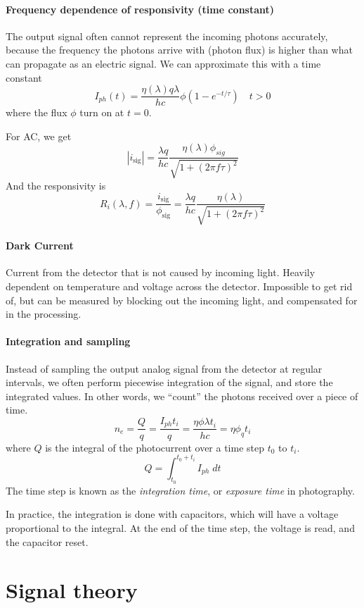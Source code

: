 \documentclass[article]{memoir}
\begin{document}
\paragraph{Frequency dependence of responsivity (time constant)}
The output signal often cannot represent the incoming photons accurately, because the frequency the photons arrive with (photon flux) is higher than what can propagate as an electric signal. We can approximate this with a time constant
\[
    I_{ph}(t) = \frac{\eta(\lambda)q\lambda}{hc}\phi\left(1 - e^{-t/\tau}\right) \quad t > 0
\]
where the flux \(\phi\) turn on at \(t=0\).

For AC, we get
\[
    |i_{\text{sig}}| = \frac{\lambda q}{h c} \frac{\eta(\lambda) \phi_{sig}}{\sqrt{1 + (2\pi f \tau)^2}}
\]
And the responsivity is
\[
    R_i(\lambda, f) = \frac{i_{\text{sig}}}{\phi_{\text{sig}}} =  \frac{\lambda q}{h c} \frac{\eta(\lambda) }{\sqrt{1 + (2\pi f \tau)^2}}
\]
\paragraph{Dark Current}
Current from the detector that is not caused by incoming light. Heavily dependent on temperature and voltage across the detector. Impossible to get rid of, but can be measured by blocking out the incoming light, and compensated for in the processing.

\paragraph{Integration and sampling}
Instead of sampling the output analog signal from the detector at regular intervals, we often perform piecewise integration of the signal, and store the integrated values. In other words, we ``count'' the photons received over a piece of time.
\[
    n_e = \frac{Q}{q} = \frac{I_{ph} t_i}{q} = \frac{\eta \phi \lambda t_i}{hc} = \eta \phi_q t_i
\]
where \(Q\) is the integral of the photocurrent over a time step \(t_0\) to \(t_i\).
\[
    Q = \int_{t_0}^{t_0+t_i} I_{ph} \; dt
\]
The time step is known as the \emph{integration time}, or \emph{exposure time} in photography.

In practice, the integration is done with capacitors, which will have a voltage proportional to the integral. At the end of the time step, the voltage is read, and the capacitor reset. 

\section{Signal theory}
\end{document}
